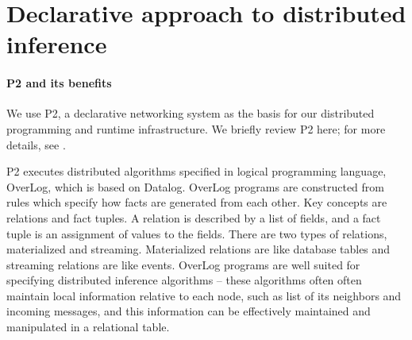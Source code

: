 % 

\section{Declarative approach to distributed inference}
\label{sec:apso}

\paragraph{P2 and its benefits} We use P2, a declarative networking system as
the basis for our distributed programming and runtime infrastructure. We
briefly review P2 here; for more details, see \cite{p2}.

P2 executes distributed algorithms specified in logical programming language,
OverLog, which is based on Datalog. OverLog programs are constructed from
rules which specify how facts are generated from each other. Key concepts are
relations and fact tuples. A relation is described by a list of fields, and a
fact tuple is an assignment of values to the fields. There are two types of
relations, materialized and streaming. Materialized relations are like
database tables and streaming relations are like events. OverLog programs are
well suited for specifying distributed inference algorithms -- these
algorithms often often maintain local information relative to each node, such
as list of its neighbors and incoming messages, and this information can be
effectively maintained and manipulated in a relational table.

